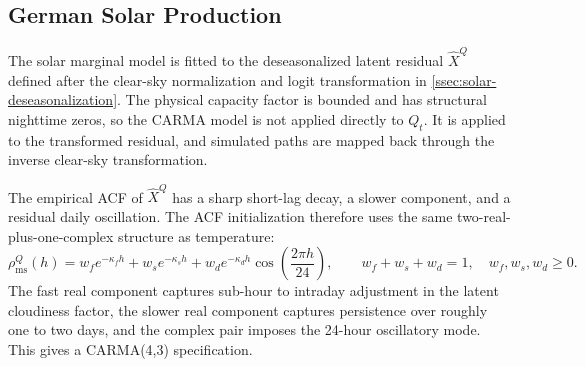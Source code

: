 \subsection{German Solar Production}\label{ssec:german-solar-carma-calibration}

The solar marginal model is fitted to the deseasonalized latent residual
\(\widehat X^Q\) defined after the clear-sky normalization and logit
transformation in \cref{ssec:solar-deseasonalization}. The physical capacity
factor is bounded and has structural nighttime zeros, so the CARMA model is not
applied directly to \(Q_t\). It is applied to the transformed residual, and
simulated paths are mapped back through the inverse clear-sky transformation.

The empirical ACF of \(\widehat X^Q\) has a sharp short-lag decay, a slower
component, and a residual daily oscillation. The ACF initialization therefore
uses the same two-real-plus-one-complex structure as temperature:
\begin{equation}
  \rho_{\mathrm{ms}}^Q(h)
  =
  w_f e^{-\kappa_f h}
  +
  w_s e^{-\kappa_s h}
  +
  w_d e^{-\kappa_d h}
  \cos\left(\frac{2\pi h}{24}\right),
  \qquad
  w_f+w_s+w_d=1,\quad w_f,w_s,w_d\ge 0 .
  \label{eq:solar-multiscale-acf}
\end{equation}
The fast real component captures sub-hour to intraday adjustment in the latent
cloudiness factor, the slower real component captures persistence over roughly
one to two days, and the complex pair imposes the 24-hour oscillatory mode. This
gives a CARMA(4,3) specification.

\FloatBarrier

